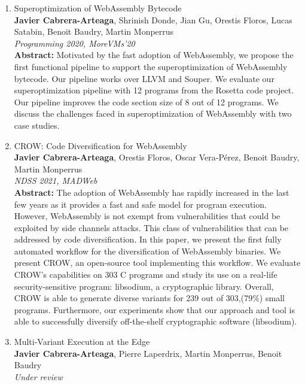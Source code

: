 \begin{enumerate}[label=\subscript{P}{{\arabic*}}]
    \item Superoptimization of WebAssembly Bytecode \cite{WasmSuperoptimizer}\\
    {\small\textbf{Javier Cabrera-Arteaga}, Shrinish Donde, Jian Gu, Orestis Floros, Lucas Satabin, Benoit Baudry, Martin Monperrus}\\
        \emph{Programming 2020, MoreVMs'20}\\
        {\small
        \textbf{Abstract:} Motivated by the fast adoption of WebAssembly, we propose the first functional pipeline to support the superoptimization of WebAssembly bytecode. Our pipeline works over LLVM and Souper. We evaluate our superoptimization pipeline with 12 programs from the Rosetta code project. Our pipeline improves the code section size of 8 out of 12 programs. We discuss the challenges faced in superoptimization of WebAssembly with two case studies.}
    \item CROW: Code Diversification for WebAssembly \cite{CROW}\\
    {\small\textbf{Javier Cabrera-Arteaga}, Orestis Floros, Oscar Vera-Pérez, Benoit Baudry, Martin Monperrus}\\
    \emph{NDSS 2021, MADWeb}\\
    {\small
    \textbf{Abstract:} The adoption of WebAssembly has rapidly increased in the last few years as it provides a fast and safe model for program execution. However, WebAssembly is not exempt from vulnerabilities that could be exploited by side channels attacks. This class of vulnerabilities that can be addressed by code diversification. In this paper, we present the first fully automated workflow for the diversification of WebAssembly binaries. We present CROW, an open-source tool implementing this workflow. We evaluate CROW's capabilities on 303 C programs and study its use on a real-life security-sensitive program: libsodium, a cryptographic library. Overall, CROW is able to generate diverse variants for 239 out of 303,(79\%) small programs. Furthermore, our experiments show that our approach and tool is able to successfully diversify off-the-shelf cryptographic software (libsodium).}
    \item Multi-Variant Execution at the Edge \cite{MEWE}\\
    {\small\textbf{Javier Cabrera-Arteaga}, Pierre Laperdrix, Martin Monperrus, Benoit Baudry}\\
    \emph{Under review}\\

\end{enumerate}
